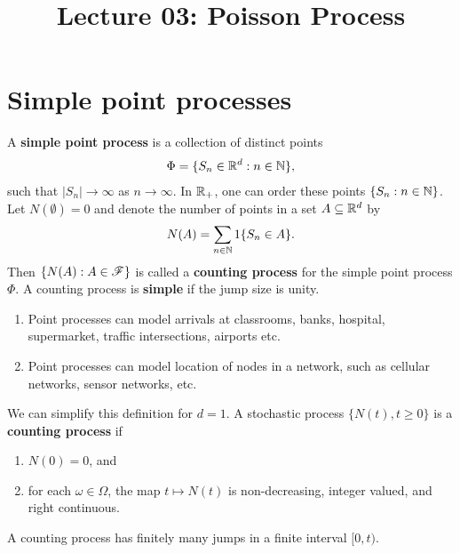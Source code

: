 \documentclass[a4paper,10pt,english]{article}
\title{Lecture 03: Poisson Process}
\author{}
\begin{document}
\maketitle

\section{Simple point processes}
A \textbf{simple point process} is a collection of distinct points 
\begin{align*}
\Phi = \{S_n \in \mathbb{R}^d: n \in \mathbb{N}\},
\end{align*}
such that $|S_n| \to \infty$ as $n \to \infty$.  
In $\mathbb{R}_+$, one can order these points $\{S_n: n \in \mathbb{N}\}$. 
Let $N(\emptyset) =0$ and denote the number of points in a set $A \subseteq \mathbb{R}^d$ by
\begin{align*}
N(A)= \sum_{n \in \mathbb{N}}1\{S_n \in A\}. 
\end{align*} 
Then $\{N(A): A \in \mathscr{F}\}$ is called a \textbf{counting process} for the simple point process $\Phi$. 
A counting process is \textbf{simple} if the jump size is unity.
\begin{shaded*}
\begin{enumerate}
\item Point processes can model arrivals at classrooms, banks, hospital, supermarket, traffic intersections, airports etc.
\item Point processes can model location of nodes in a network, such as cellular networks, sensor networks, etc.
\end{enumerate}
\end{shaded*}
We can simplify this definition for $d=1$. 
A stochastic process $\{N(t), t\ge 0\}$ is a \textbf{counting process} if
\begin{enumerate}
  \item $N(0) = 0$, and 
  \item for each $\omega \in \Omega$, the map $t\mapsto N(t)$ is non-decreasing, integer valued, and right continuous.%
\end{enumerate}

\begin{lem} 
A counting process has finitely many jumps in a finite interval $[0,t)$.
\end{lem}
\end{document}
